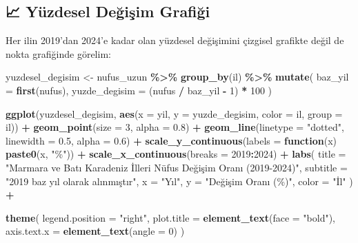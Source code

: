 \documentclass[
]{article}
\newenvironment{Shaded}{\begin{snugshade}}{\end{snugshade}}
\newcommand{\AttributeTok}[1]{\textcolor[rgb]{0.13,0.29,0.53}{#1}}
\newcommand{\ControlFlowTok}[1]{\textcolor[rgb]{0.13,0.29,0.53}{\textbf{#1}}}
\newcommand{\DecValTok}[1]{\textcolor[rgb]{0.00,0.00,0.81}{#1}}
\newcommand{\FloatTok}[1]{\textcolor[rgb]{0.00,0.00,0.81}{#1}}
\newcommand{\FunctionTok}[1]{\textcolor[rgb]{0.13,0.29,0.53}{\textbf{#1}}}
\newcommand{\NormalTok}[1]{#1}
\newcommand{\OtherTok}[1]{\textcolor[rgb]{0.56,0.35,0.01}{#1}}
\newcommand{\SpecialCharTok}[1]{\textcolor[rgb]{0.81,0.36,0.00}{\textbf{#1}}}
\newcommand{\StringTok}[1]{\textcolor[rgb]{0.31,0.60,0.02}{#1}}
\begin{document}
\subsection{📈 Yüzdesel Değişim
Grafiği}\label{yuxfczdesel-deux11fiux15fim-grafiux11fi}

Her ilin 2019'dan 2024'e kadar olan yüzdesel değişimini çizgisel
grafikte değil de nokta grafiğinde görelim:

\begin{Shaded}
\begin{Highlighting}[]
\NormalTok{yuzdesel\_degisim }\OtherTok{\textless{}{-}}\NormalTok{ nufus\_uzun }\SpecialCharTok{\%\textgreater{}\%}
  \FunctionTok{group\_by}\NormalTok{(il) }\SpecialCharTok{\%\textgreater{}\%}
  \FunctionTok{mutate}\NormalTok{(}
    \AttributeTok{baz\_yil =} \FunctionTok{first}\NormalTok{(nufus),}
    \AttributeTok{yuzde\_degisim =}\NormalTok{ (nufus }\SpecialCharTok{/}\NormalTok{ baz\_yil }\SpecialCharTok{{-}} \DecValTok{1}\NormalTok{) }\SpecialCharTok{*} \DecValTok{100}
\NormalTok{  )}

\FunctionTok{ggplot}\NormalTok{(yuzdesel\_degisim, }\FunctionTok{aes}\NormalTok{(}\AttributeTok{x =}\NormalTok{ yil, }\AttributeTok{y =}\NormalTok{ yuzde\_degisim, }\AttributeTok{color =}\NormalTok{ il, }\AttributeTok{group =}\NormalTok{ il)) }\SpecialCharTok{+}
  \FunctionTok{geom\_point}\NormalTok{(}\AttributeTok{size =} \DecValTok{3}\NormalTok{, }\AttributeTok{alpha =} \FloatTok{0.8}\NormalTok{) }\SpecialCharTok{+}  
  \FunctionTok{geom\_line}\NormalTok{(}\AttributeTok{linetype =} \StringTok{"dotted"}\NormalTok{, }\AttributeTok{linewidth =} \FloatTok{0.5}\NormalTok{, }\AttributeTok{alpha =} \FloatTok{0.6}\NormalTok{) }\SpecialCharTok{+}
  \FunctionTok{scale\_y\_continuous}\NormalTok{(}\AttributeTok{labels =} \ControlFlowTok{function}\NormalTok{(x) }\FunctionTok{paste0}\NormalTok{(x, }\StringTok{"\%"}\NormalTok{)) }\SpecialCharTok{+}
  \FunctionTok{scale\_x\_continuous}\NormalTok{(}\AttributeTok{breaks =} \DecValTok{2019}\SpecialCharTok{:}\DecValTok{2024}\NormalTok{) }\SpecialCharTok{+}
  \FunctionTok{labs}\NormalTok{(}
    \AttributeTok{title =} \StringTok{"Marmara ve Batı Karadeniz İlleri Nüfus Değişim Oranı (2019{-}2024)"}\NormalTok{,}
    \AttributeTok{subtitle =} \StringTok{"2019 baz yıl olarak alınmıştır"}\NormalTok{,}
    \AttributeTok{x =} \StringTok{"Yıl"}\NormalTok{,}
    \AttributeTok{y =} \StringTok{"Değişim Oranı (\%)"}\NormalTok{,}
    \AttributeTok{color =} \StringTok{"İl"}
\NormalTok{  ) }\SpecialCharTok{+}
  
  \FunctionTok{theme}\NormalTok{(}
    \AttributeTok{legend.position =} \StringTok{"right"}\NormalTok{,}
    \AttributeTok{plot.title =} \FunctionTok{element\_text}\NormalTok{(}\AttributeTok{face =} \StringTok{"bold"}\NormalTok{),}
    \AttributeTok{axis.text.x =} \FunctionTok{element\_text}\NormalTok{(}\AttributeTok{angle =} \DecValTok{0}\NormalTok{)}
\NormalTok{  )}
\end{Highlighting}
\end{Shaded}
\end{document}
